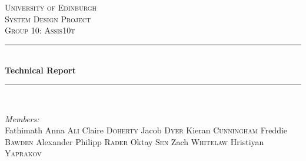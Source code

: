 \documentclass[12pt]{article}
\begin{document}
\begin{titlepage}

\newcommand{\HRule}{\rule{\linewidth}{0.5mm}} 

\center %
 


\hspace{2.5cm}\textsc{\LARGE University of Edinburgh}\\[1.5cm] %
\textsc{\Large System Design Project}\\[0.5cm] %
\textsc{\large Group 10: Assis10t}\\[0.5cm] %


\HRule \\[0.4cm]
{ \huge \bfseries Technical Report}\\[0.4cm] %
\HRule \\[1.5cm]
 
\begin{minipage}{0.45\textwidth}
\begin{flushleft} \large
\emph{Members:}\\
Fathimath Anna \textsc{Ali}
\newline Claire \textsc{Doherty}
\newline Jacob \textsc{Dyer}
\newline Kieran \textsc{Cunningham}
\newline Freddie \textsc{Bawden}
\newline Alexander Philipp \textsc{Rader}
\newline Oktay \textsc{Sen}
\newline Zach \textsc{Whitelaw}
\newline Hristiyan \textsc{Yaprakov}


\end{flushleft}
\end{minipage}
\end{titlepage}
\end{document}
